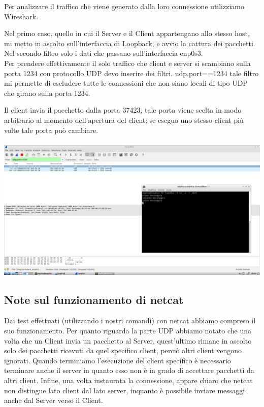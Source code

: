 \documentclass[a4paper]{article}
\begin{document}
\par Per analizzare il traffico che viene generato dalla loro connessione utilizziamo Wireshark.
\par Nel primo caso, quello in cui il Server e il Client appartengano allo stesso host, mi metto in ascolto sull’interfaccia di Loopback, e avvio la cattura dei pacchetti. Nel secondo filtro solo i dati che passano sull’interfaccia enp0s3. \\ Per prendere effettivamente il solo traffico che client e server si scambiano sulla porta 1234 con protocollo UDP devo inserire dei filtri. udp.port==1234 tale filtro mi permette di escludere tutte le connessioni che non siano locali di tipo UDP che girano sulla porta 1234. 
\par Il client invia il pacchetto dalla porta 37423, tale porta viene scelta in modo arbitrario al momento dell’apertura del client; se eseguo uno stesso client più volte tale porta può cambiare. \\ \\

\includegraphics[width=\linewidth]{task_1/nc_server.png}
\newpage
\subsection{Note sul funzionamento di netcat}
Dai test effettuati (utilizzando i nostri comandi) con netcat abbiamo compreso il suo funzionamento. Per quanto riguarda la parte UDP abbiamo notato che una volta che un Client invia un pacchetto al Server, quest’ultimo rimane in ascolto solo dei pacchetti ricevuti da quel specifico client, perciò altri client vengono ignorati. Quando terminiamo l’esecuzione del client specifico è necessario terminare anche il server in quanto esso non è in grado di accettare pacchetti da altri client. Infine, una volta instaurata la connessione, appare chiaro che netcat non distingue lato client dal lato server, inquanto è possibile inviare messaggi anche dal Server verso il Client.
\\
\end{document}

